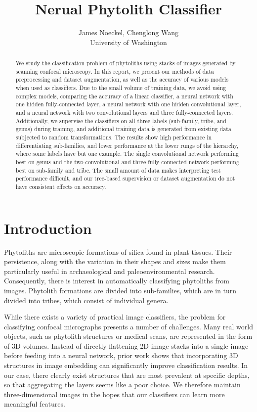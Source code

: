\documentclass{article}
\title{Nerual Phytolith Classifier}
\author{
  James Noeckel, Chenglong Wang\\
  University of Washington
}
\begin{document}

\maketitle

\begin{abstract}
  We study the classification problem of phytoliths using stacks of images generated by scanning confocal microscopy. In this report, we present our methods of data preprocessing and dataset augmentation, as well as the accuracy of various models when used as classifiers. Due to the small volume of training data, we avoid using complex models, comparing the accuracy of a linear classifier, a neural network with one hidden fully-connected layer, a neural network with one hidden convolutional layer, and a neural network with two convolutional layers and three fully-connected layers. Additionally, we supervise the classifiers on all three labels (sub-family, tribe, and genus) during training, and additional training data is generated from existing data subjected to random transformations. The results show high performance in differentiating sub-families, and lower performance at the lower rungs of the hierarchy, where some labels have but one example. The single convolutional network performing best on genus and the two-convolutional and three-fully-connected network performing best on sub-family and tribe. The small amount of data makes interpreting test performance difficult, and our tree-based supervision or dataset augmentation do not have consistent effects on accuracy.
\end{abstract}

\section{Introduction}

Phytoliths are microscopic formations of silica found in plant tissues. Their persistence, along with the variation in their shapes and sizes make them particularly useful in archaeological and paleoenvironmental research. Consequently, there is interest in automatically classifying phytoliths from images. Phytolith formations are divided into sub-families, which are in turn divided into tribes, which consist of individual genera.

While there exists a variety of practical image classifiers, the problem for classifying confocal micrographs presents a number of challenges. Many real world objects, such as phytolith structures or medical scans, are represented in the form of 3D volumes. Instead of directly flattening 2D image stacks into a single image before feeding into a neural network, prior work shows that incorporating 3D structures in image embedding can significantly improve classification results.  In our case, there clearly exist structures that are most prevalent at specific depths, so that aggregating the layers seems like a poor choice. We therefore maintain three-dimensional images in the hopes that our classifiers can learn more meaningful features.
\end{document}
